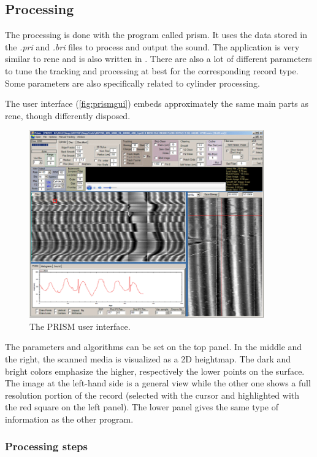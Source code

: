 \subsection{Processing}

The processing is done with the program called \gls{prism}. It uses the data stored in the \emph{.pri} and \emph{.bri} files to process and output the sound. The application is very similar to \gls{rene} and is also written in \Csh. There are also a lot of different parameters to tune the tracking and processing at best for the corresponding record type. Some parameters are also specifically related to cylinder processing.

The user interface (\autoref{fig:prismgui}) embeds approximately the same main parts as \gls{rene}, though differently disposed.

\begin{figure}[!ht]
\centering
\includegraphics[width=0.9\textwidth]{images/prism-gui}
\caption{The PRISM user interface.}
\label{fig:prismgui}
\end{figure}

The parameters and algorithms can be set on the top panel. In the middle and the right, the scanned media is visualized as a 2D heightmap. The dark and bright colors emphasize the higher, respectively the lower points on the surface. The image at the left-hand side is a general view while the other one shows a full resolution portion of the record (selected with the cursor and highlighted with the red square on the left panel). The lower panel gives the same type of information as the other program.

\subsubsection{Processing steps}
\label{sec:3dprocsteps}

